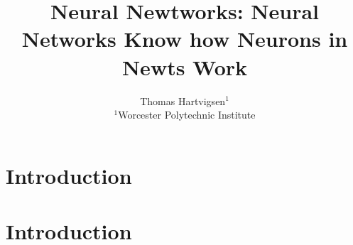




\title{Neural Newtworks: Neural Networks Know how Neurons in Newts Work}
\author{
    Thomas Hartvigsen$^1$\\
    \affiliations
    $^1$Worcester Polytechnic Institute\\
}



\maketitle

\begin{abstract}
    
\end{abstract}

\section{Introduction}
    
\section{Introduction}





